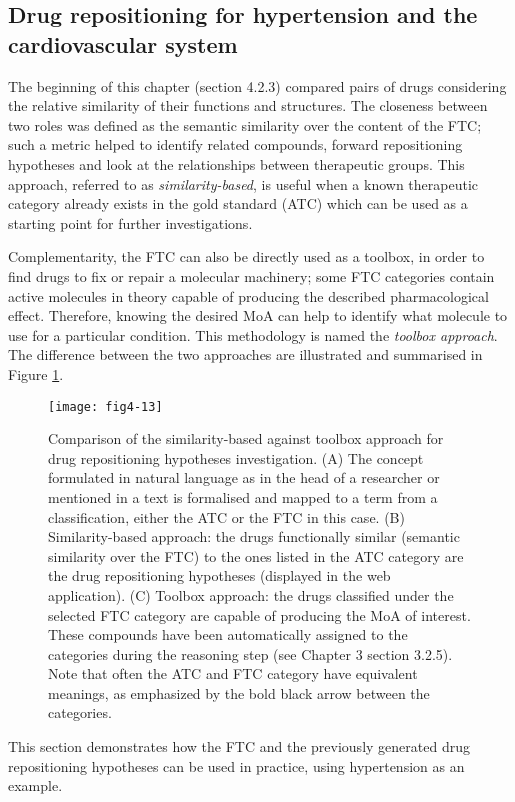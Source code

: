\subsection{Drug repositioning for hypertension and the cardiovascular system}
The beginning of this chapter (section 4.2.3) compared pairs of drugs considering the relative similarity of their functions and structures. The closeness between two roles was defined as the semantic similarity over the content of the FTC; such a metric helped to identify related compounds, forward repositioning hypotheses and look at the relationships between therapeutic groups. This approach, referred to as \emph{similarity-based}, is useful when a known therapeutic category already exists in the gold standard (ATC) which can be used as a starting point for further investigations.

Complementarity, the FTC can also be directly used as a toolbox, in order to find drugs to fix or repair a molecular machinery; some FTC categories contain active molecules in theory capable of producing the described pharmacological effect. Therefore, knowing the desired MoA can help to identify what molecule to use for a particular condition. This methodology is named the \emph{toolbox approach}. The difference between the two approaches are illustrated and summarised in Figure \ref{fig4-13}.

\begin{figure}[ht]
    \centering
    \texttt{[image: fig4-13]}
    \caption{Comparison of the similarity-based against toolbox approach for drug repositioning hypotheses investigation. (A) The concept formulated in natural language as in the head of a researcher or mentioned in a text is formalised and mapped to a term from a classification, either the ATC or the FTC in this case. (B) Similarity-based approach: the drugs functionally similar (semantic similarity over the FTC) to the ones listed in the ATC category are the drug repositioning hypotheses (displayed in the web application). (C) Toolbox approach: the drugs classified under the selected FTC category are capable of producing the MoA of interest. These compounds have been automatically assigned to the categories during the reasoning step (see Chapter 3 section 3.2.5). Note that often the ATC and FTC category have equivalent meanings, as emphasized by the bold black arrow between the categories.}
    \label{fig4-13}
\end{figure}

This section demonstrates how the FTC and the previously generated drug repositioning hypotheses can be used in practice, using hypertension as an example.

